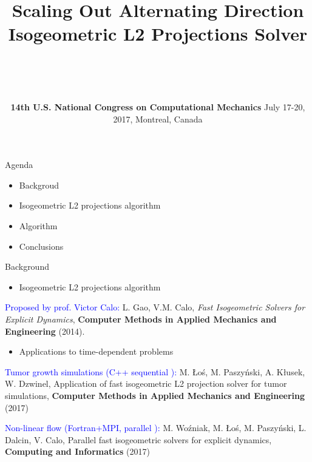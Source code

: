 \documentclass[c]{beamer}
\title{%
Scaling Out Alternating Direction Isogeometric L2 Projections Solver}
\author{%
    \inblue{\bf Grzegorz Gurgul (AGH)} \\
    \inblue{Marcin \L{}o\'{s} (AGH)} \\
    \inblue{Danuta~Szeliga (AGH)} \\
      \inblue{\bf Maciej Paszy\'{n}ski (AGH)} }
\date{{\bf 14th U.S. National Congress on Computational Mechanics} \break \break July 17-20, 2017, Montreal, Canada}
\newcommand{\inblue}[1]{\textcolor{blue}{#1}}
\begin{document}

\begin{frame}
  \titlepage
\end{frame}

\begin{frame}{Agenda}

\begin{itemize}
  \item Backgroud
  \item Isogeometric L2 projections algorithm
  \item Algorithm
  \item Conclusions
\end{itemize}

\end{frame}


\begin{frame}{Background}

{\small
\begin{itemize}
  \item Isogeometric L2 projections algorithm
\end{itemize}
  \inblue{Proposed by prof. Victor Calo:} 
L. Gao, V.M. Calo, \emph{Fast Isogeometric Solvers for Explicit Dynamics}, {\bf Computer Methods in Applied Mechanics and Engineering} (2014). 
\begin{itemize}
  \item Applications to time-dependent problems
\end{itemize}
\inblue{Tumor growth simulations (C++ sequential ): }M. \L{}o\'{s}, M. Paszy\'{n}ski, A. K\l{}usek, W. Dzwinel, Application of fast isogeometric L2 projection solver for tumor simulations, {\bf Computer Methods in Applied Mechanics and Engineering} (2017) 

\inblue{Non-linear flow (Fortran+MPI, parallel ): }
M. Wo\'{z}niak, M. \L{}o\'{s}, M. Paszy\'{n}ski, L. Dalcin, V. Calo, 
Parallel fast isogeometric solvers for explicit dynamics, {\bf Computing and Informatics} (2017) 
}

\end{frame}



\end{document}

